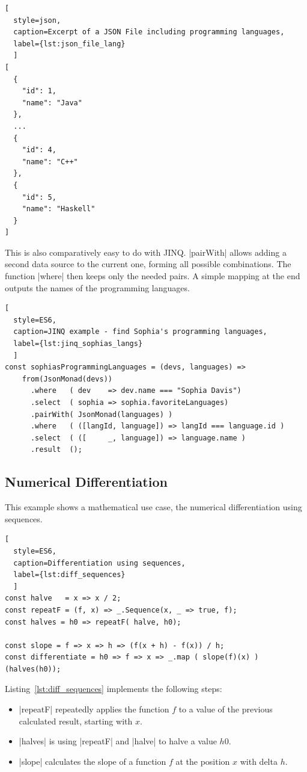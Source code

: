 \begin{lstlisting}[
  style=json, 
  caption=Excerpt of a JSON File including programming languages,
  label={lst:json_file_lang}
  ]
[
  {
    "id": 1,
    "name": "Java"
  },
  ...
  {
    "id": 4,
    "name": "C++"
  },
  {
    "id": 5,
    "name": "Haskell"
  }
]
\end{lstlisting}
This is also comparatively easy to do with JINQ. |pairWith| allows adding a
second data source to the current one, forming all possible combinations. The
function |where| then keeps only the needed pairs. A simple mapping at the end
outputs the names of the programming languages.
\begin{lstlisting}[
  style=ES6, 
  caption=JINQ example - find Sophia's programming languages,
  label={lst:jinq_sophias_langs}
  ]
const sophiasProgrammingLanguages = (devs, languages) =>
    from(JsonMonad(devs))
      .where   ( dev    => dev.name === "Sophia Davis")
      .select  ( sophia => sophia.favoriteLanguages)
      .pairWith( JsonMonad(languages) )
      .where   ( ([langId, language]) => langId === language.id )
      .select  ( ([     _, language]) => language.name )
      .result  ();
\end{lstlisting}

\subsection{Numerical Differentiation}
\label{sub:Numerical Differentiation}
This example shows a mathematical use case, the numerical differentiation using
sequences.

\begin{lstlisting}[
  style=ES6, 
  caption=Differentiation using sequences,
  label={lst:diff_sequences}
  ]
const halve   = x => x / 2;
const repeatF = (f, x) => _.Sequence(x, _ => true, f);
const halves = h0 => repeatF( halve, h0);

const slope = f => x => h => (f(x + h) - f(x)) / h;
const differentiate = h0 => f => x => _.map ( slope(f)(x) ) (halves(h0));
\end{lstlisting}

Listing~\ref{lst:diff_sequences} implements the following steps: 


\begin{itemize}
  \item{|repeatF| repeatedly applies the function $f$ to a value of the
    previous calculated result, starting with $x$.}
  \item{ |halves| is using |repeatF| and |halve| to halve a value $h0$.} 
    \item{|slope| calculates the slope of a function $f$ at the position $x$
      with delta $h$.}
 \end{itemize}

